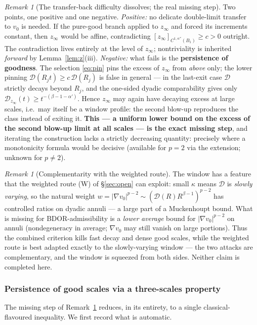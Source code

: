 \documentclass[11pt]{amsart}
\theoremstyle{plain}
\theoremstyle{definition}
\theoremstyle{remark}
\newtheorem{remark}[theorem]{Remark}
\newcommand{\al}{\alpha}
\begin{document}
\begin{remark}[The transfer-back difficulty dissolves; the real missing
step]\label{rem:z-missing}
Two points, one positive and one negative.
\emph{Positive:} no delicate double-limit transfer to $v_0$ is needed. If
the pure-good branch applied to $z_\infty$ and forced its increments
constant, then $z_\infty$ would be affine, contradicting
$[z_\infty]_{C^{1,\al''}(B_1)}\ge c>0$ outright. The contradiction lives
entirely at the level of $z_\infty$; nontriviality is inherited
\emph{forward} by Lemma~\ref{lem:z}(iii).
\emph{Negative:} what fails is the \textbf{persistence of goodness}. The
selection \eqref{eq:pin} pins the excess of $z_\infty$ from \emph{above}
only; the lower pinning $\mathcal D(R_jt)\ge c\,\mathcal D(R_j)$ is false
in general --- in the last-exit case $\mathcal D$ strictly decays beyond
$R_j$, and the one-sided dyadic comparability gives only
$\mathcal D_{z_\infty}(t)\ge t^{-(\beta-1-\al')}$. Hence $z_\infty$ may
again have decaying excess at large scales, i.e.\ may itself be a window
profile: the second blow-up reproduces the class instead of exiting it.
\textbf{This --- a uniform lower bound on the excess of the second blow-up
limit at all scales --- is the exact missing step}, and iterating the
construction lacks a strictly decreasing quantity: precisely where a
monotonicity formula would be decisive \textnormal{(}available for $p=2$
via the extension; unknown for $p\neq2$\textnormal{)}.
\end{remark}

\begin{remark}[Complementarity with the weighted route]\label{rem:window-bdor}
The window has a feature that the weighted route (W) of \S\ref{sec:open}
can exploit: small $\kappa$ means $\mathcal D$ is \emph{slowly varying}, so
the natural weight $w=|\nabla v_0|^{p-2}\sim(\mathcal D(R)R^{\beta-1})^{p-2}$
has controlled ratios on dyadic annuli --- a large part of a Muckenhoupt
bound. What is missing for BDOR-admissibility is a \emph{lower average}
bound for $|\nabla v_0|^{p-2}$ on annuli \textnormal{(}nondegeneracy in
average; $\nabla v_0$ may still vanish on large portions\textnormal{)}.
Thus the combined criterion kills fast decay and dense good scales, while
the weighted route is best adapted exactly to the slowly-varying window ---
the two attacks are complementary, and the window is squeezed from both
sides. Neither claim is completed here.
\end{remark}

\subsubsection*{Persistence of good scales via a three-scales property}
The missing step of Remark~\ref{rem:z-missing} reduces, in its entirety, to
a single classical-flavoured inequality. We first record what is automatic.
\end{document}
